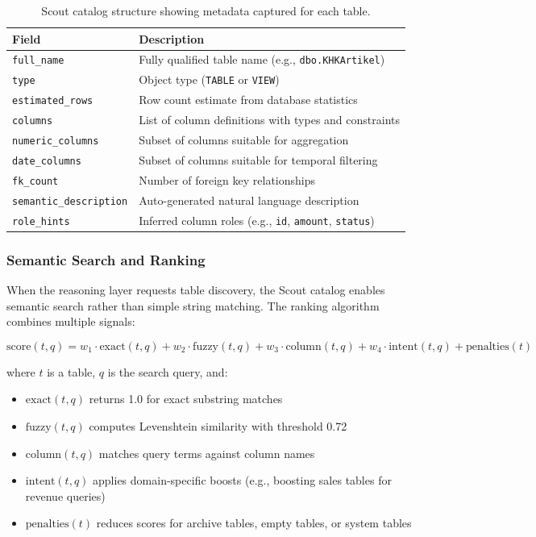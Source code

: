 \begin{table}[htbp]
    \centering
    \caption{Scout catalog structure showing metadata captured for each table.}
    \label{tab:catalog-structure}
    \begin{tabular}{lp{8cm}}
        \toprule
        \textbf{Field} & \textbf{Description} \\
        \midrule
        \texttt{full\_name} & Fully qualified table name (e.g., \texttt{dbo.KHKArtikel}) \\
        \texttt{type} & Object type (\texttt{TABLE} or \texttt{VIEW}) \\
        \texttt{estimated\_rows} & Row count estimate from database statistics \\
        \texttt{columns} & List of column definitions with types and constraints \\
        \texttt{numeric\_columns} & Subset of columns suitable for aggregation \\
        \texttt{date\_columns} & Subset of columns suitable for temporal filtering \\
        \texttt{fk\_count} & Number of foreign key relationships \\
        \texttt{semantic\_description} & Auto-generated natural language description \\
        \texttt{role\_hints} & Inferred column roles (e.g., \texttt{id}, \texttt{amount}, \texttt{status}) \\
        \bottomrule
    \end{tabular}
\end{table}

\subsubsection{Semantic Search and Ranking}

When the reasoning layer requests table discovery, the Scout catalog enables semantic search rather than simple string matching. The ranking algorithm combines multiple signals:

\begin{equation}
    \text{score}(t, q) = w_1 \cdot \text{exact}(t, q) + w_2 \cdot \text{fuzzy}(t, q) + w_3 \cdot \text{column}(t, q) + w_4 \cdot \text{intent}(t, q) + \text{penalties}(t)
    \label{eq:ranking}
\end{equation}

\noindent where $t$ is a table, $q$ is the search query, and:

\begin{itemize}
    \item $\text{exact}(t, q)$ returns 1.0 for exact substring matches
    \item $\text{fuzzy}(t, q)$ computes Levenshtein similarity with threshold 0.72
    \item $\text{column}(t, q)$ matches query terms against column names
    \item $\text{intent}(t, q)$ applies domain-specific boosts (e.g., boosting sales tables for revenue queries)
    \item $\text{penalties}(t)$ reduces scores for archive tables, empty tables, or system tables
\end{itemize}


